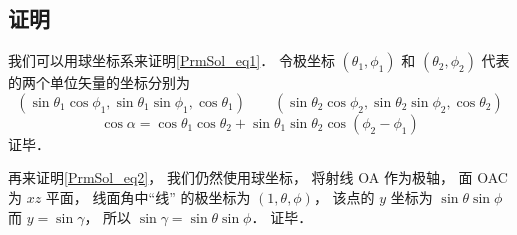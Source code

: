 \subsection{证明}
我们可以用球坐标系来证明\autoref{PrmSol_eq1}． 令极坐标 $(\theta_1, \phi_1)$ 和 $(\theta_2, \phi_2)$ 代表的两个单位矢量的坐标分别为
\begin{equation}
(\sin\theta_1\cos\phi_1, \sin\theta_1\sin\phi_1, \cos\theta_1)
\qquad
(\sin\theta_2\cos\phi_2, \sin\theta_2\sin\phi_2, \cos\theta_2)
\end{equation}
\begin{equation}
\cos\alpha = \cos\theta_1 \cos\theta_2 + \sin\theta_1 \sin\theta_2 \cos(\phi_2 - \phi_1)
\end{equation}
证毕．

再来证明\autoref{PrmSol_eq2}， 我们仍然使用球坐标， 将射线 OA 作为极轴， 面 OAC 为 $xz$ 平面， 线面角中“线” 的极坐标为 $(1, \theta, \phi)$， 该点的 $y$ 坐标为 $\sin\theta \sin\phi$ 而 $y = \sin\gamma$， 所以 $\sin\gamma = \sin\theta \sin\phi$． 证毕．